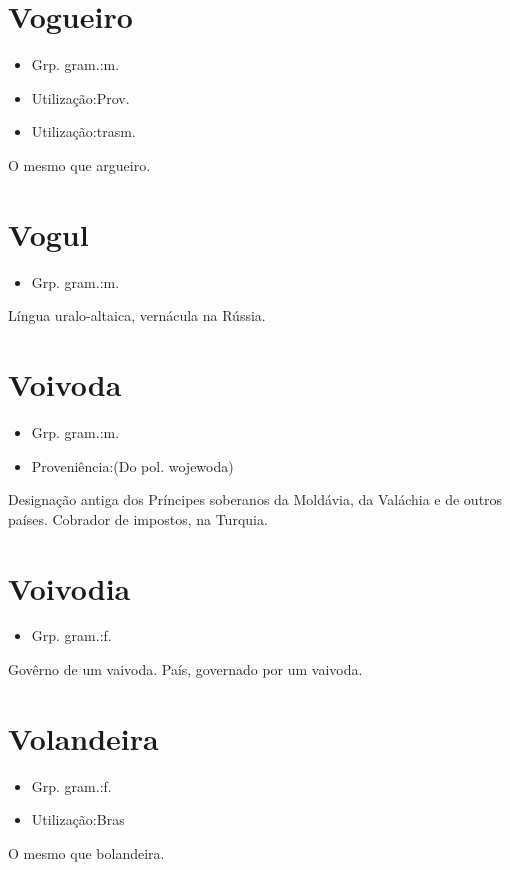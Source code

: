 \documentclass{article}
\begin{document}
\section{Vogueiro}
\begin{itemize}
\item {Grp. gram.:m.}
\end{itemize}
\begin{itemize}
\item {Utilização:Prov.}
\end{itemize}
\begin{itemize}
\item {Utilização:trasm.}
\end{itemize}
O mesmo que \textunderscore argueiro\textunderscore .
\section{Vogul}
\begin{itemize}
\item {Grp. gram.:m.}
\end{itemize}
Língua uralo-altaica, vernácula na Rússia.
\section{Voivoda}
\begin{itemize}
\item {Grp. gram.:m.}
\end{itemize}
\begin{itemize}
\item {Proveniência:(Do pol. \textunderscore wojewoda\textunderscore )}
\end{itemize}
Designação antiga dos Príncipes soberanos da Moldávia, da Valáchia e de outros países.
Cobrador de impostos, na Turquia.
\section{Voivodia}
\begin{itemize}
\item {Grp. gram.:f.}
\end{itemize}
Govêrno de um vaivoda.
País, governado por um vaivoda.
\section{Volandeira}
\begin{itemize}
\item {Grp. gram.:f.}
\end{itemize}
\begin{itemize}
\item {Utilização:Bras}
\end{itemize}
O mesmo que \textunderscore bolandeira\textunderscore .
\end{document}
